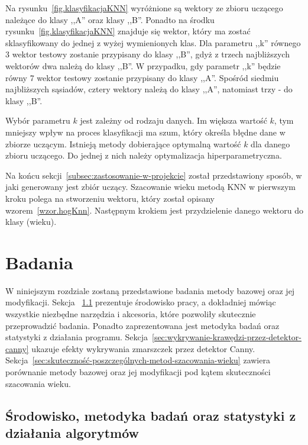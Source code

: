\documentclass[a4paper,twoside,12pt]{book}
\begin{document}
    Na rysunku~\ref{fig.klasyfikacjaKNN} wyróżnione są wektory ze zbioru uczącego należące do klasy ,,A'' oraz klasy
    ,,B''. Ponadto na środku rysunku~\ref{fig.klasyfikacjaKNN} znajduje się wektor, który ma zostać
    sklasyfikowany do jednej z wyżej wymienionych klas.
    Dla parametru ,,k'' równego 3 wektor testowy zostanie przypisany do klasy ,,B'', gdyż z trzech najbliższych wektorów dwa
    należą do klasy ,,B''. W przypadku, gdy parametr ,,k'' będzie równy 7 wektor testowy zostanie przypisany do klasy
    ,,A''. Spośród siedmiu najbliższych sąsiadów, cztery wektory należą do klasy ,,A'', natomiast trzy - do klasy ,,B''.

    Wybór parametru $k$ jest zależny od rodzaju danych. Im większa wartość $k$, tym mniejszy wpływ na proces
    klasyfikacji ma szum, który określa błędne dane w zbiorze uczącym. Istnieją metody dobierające optymalną wartość $k$ dla
    danego zbioru uczącego. Do jednej z nich należy optymalizacja hiperparametryczna.

    Na końcu sekcji~\ref{subsec:zastosowanie-w-projekcie} został przedstawiony sposób, w jaki generowany jest zbiór
    uczący.
    Szacowanie wieku metodą KNN w pierwszym kroku polega na stworzeniu wektoru, który został opisany
    wzorem~\ref{wzor.hogKnn}.
    Następnym krokiem jest przydzielenie danego wektoru do klasy (wieku).

    \chapter{Badania}\label{ch:badania}
    W niniejszym rozdziale zostaną przedstawione badania metody bazowej oraz jej modyfikacji.
    Sekcja ~\ref{sec:środowisko-pracy} prezentuje środowisko pracy, a dokładniej mówiąc wszystkie
    niezbędne narzędzia i akcesoria, które pozwoliły skutecznie przeprowadzić badania. Ponadto zaprezentowana jest
    metodyka badań oraz statystyki z działania programu.
    Sekcja~\ref{sec:wykrywanie-krawędzi-przez-detektor-canny} ukazuje efekty wykrywania zmarszczek przez detektor
    Canny.
    Sekcja~\ref{sec:skuteczność-poszczególnych-metod-szacowania-wieku} zawiera porównanie metody bazowej oraz jej
    modyfikacji
    pod kątem skuteczności szacowania wieku.

    \section{Środowisko, metodyka badań oraz statystyki z działania algorytmów}\label{sec:środowisko-pracy}
\end{document}
